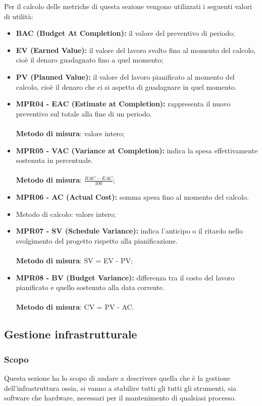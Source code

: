 Per il calcolo delle metriche di questa sezione vengono utilizzati i seguenti valori di utilità:
\begin{itemize}
    \item \textbf{BAC (Budget At Completion):} il valore del preventivo di periodo;
    \item \textbf{EV (Earned Value):}  il valore del lavoro svolto fino al momento del calcolo, cioè il denaro guadagnato fino a quel momento;
    \item \textbf{PV (Planned Value):} il valore del lavoro pianificato al momento del calcolo, cioè il denaro che ci si aspetta di guadagnare in quel momento.
\end{itemize}
\begin{itemize}
    \item \textbf{MPR04 - EAC (Estimate at Completion):} rappresenta il nuovo preventivo sul totale alla fine di un periodo.\\
          \\\textbf{Metodo di misura}: valore intero;
    \item \textbf{MPR05 - VAC (Variance at Completion):} indica la spesa effettivamente sostenuta in percentuale.\\
          \\\textbf{Metodo di misura}: $\frac{BAC - EAC}{100}$;
    \item \textbf{MPR06 - AC (Actual Cost):} somma spesa fino al momento del calcolo.\\
    \item Metodo di calcolo: valore intero;
    \item \textbf{MPR07 - SV (Schedule Variance):} indica l'anticipo o il ritardo nello svolgimento del progetto rispetto alla pianificazione.\\
          \\\textbf{Metodo di misura}: SV = EV - PV;
    \item \textbf{MPR08 - BV (Budget Variance):} differenza tra il costo del lavoro pianificato e quello sostenuto alla data corrente.\\
          \\\textbf{Metodo di misura}: CV = PV - AC.
\end{itemize}
\subsection{Gestione infrastrutturale}
\subsubsection{Scopo}
Questa sezione ha lo scopo di andare a descrivere quella che è la gestione dell'infrastruttura ossia, si vanno a stabilire tutti gli tutti gli strumenti, sia software che hardware, necessari per il mantenimento di qualsiasi processo.
